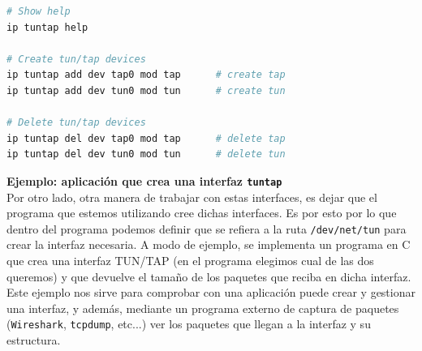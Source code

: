 \documentclass[a4paper, oneside, 12pt]{book}
\begin{document}
	\vspace{10px}

	\begin{lstlisting}[language=Bash, label=lst: ej2 tuntap ip, caption=Ejemplo de uso de \texttt{ip} para controlar interfaces TUN/TAP]
# Show help
ip tuntap help

# Create tun/tap devices
ip tuntap add dev tap0 mod tap		# create tap
ip tuntap add dev tun0 mod tun		# create tun

# Delete tun/tap devices
ip tuntap del dev tap0 mod tap		# delete tap
ip tuntap del dev tun0 mod tun		# delete tun
	\end{lstlisting}

	\pagebreak
	
	\noindent \textbf{\large Ejemplo: aplicación que crea una interfaz \texttt{tuntap}}\\

	\noindent Por otro lado, otra manera de trabajar con estas interfaces, es dejar que el programa que estemos utilizando cree dichas interfaces. Es por esto por lo que dentro del programa podemos definir que se refiera a la ruta \texttt{/dev/net/tun} para crear la interfaz necesaria. A modo de ejemplo, se implementa un programa en C que crea una interfaz TUN/TAP (en el programa elegimos cual de las dos queremos) y que devuelve el tamaño de los paquetes que reciba en dicha interfaz. Este ejemplo nos sirve para comprobar con una aplicación puede crear y gestionar una interfaz, y además, mediante un programa externo de captura de paquetes (\texttt{Wireshark}, \texttt{tcpdump}, etc...) ver los paquetes que llegan a la interfaz y su estructura. \\
	
\end{document}
